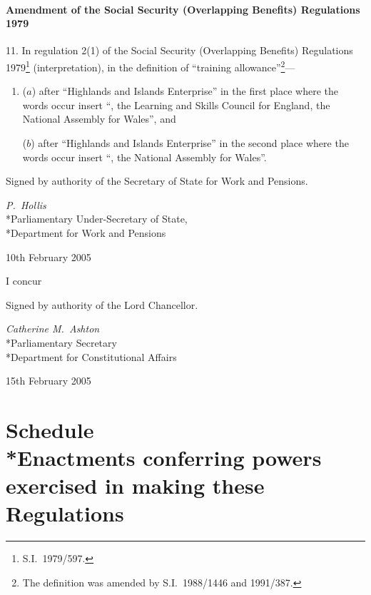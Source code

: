 \documentclass[12pt,a4paper]{article}
\begin{document}
\subsection[11. Amendment of the Social Security (Overlapping Benefits) Regulations 1979]{Amendment of the Social Security (Overlapping Benefits) Regulations 1979}

11.  In regulation 2(1) of the Social Security (Overlapping Benefits) Regulations 1979\footnote{S.I.\ 1979/597.} (interpretation), in the definition of “training allowance”\footnote{The definition was amended by S.I.\ 1988/1446 and 1991/387.}—
\begin{enumerate}\item[]
($a$) after “Highlands and Islands Enterprise” in the first place where the words occur insert “, the Learning and Skills Council for England, the National Assembly for Wales”, and

($b$) after “Highlands and Islands Enterprise” in the second place where the words occur insert “, the National Assembly for Wales”.
\end{enumerate}

\bigskip

Signed 
by authority of the 
Secretary of State for Work and Pensions.

{\raggedleft
\emph{P.~Hollis}\\*Parliamentary Under-Secretary of State,\\*Department for Work and Pensions

}

10th February 2005

\bigskip

I concur

Signed 
by authority of the 
Lord Chancellor.

{\raggedleft
\emph{Catherine M.~Ashton}\\*Parliamentary Secretary\\*Department for Constitutional Affairs

}


15th February 2005

\small

\part[Schedule --- Enactments conferring powers exercised in making these Regulations]{Schedule\\*Enactments conferring powers exercised in making these Regulations}
\end{document}
